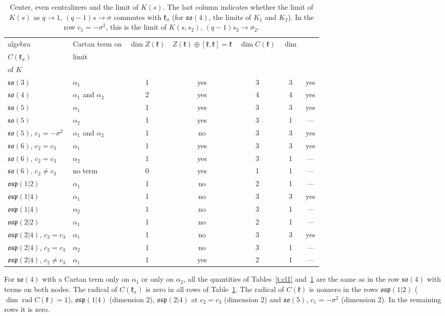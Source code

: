 \documentclass[12pt,a4paper]{article}
\makeatletter
\newcommand{\kk}{\mathfrak{k}}
\newcommand{\so}{\mathfrak{so}}
\newcommand{\osp}{\mathfrak{osp}}
\newcommand{\hd}[2][c]{\tabular[b]{@{}#1@{}}#2\endtabular}
\makeatother
\begin{document}
\begin{table}[H]
\centering\small
\setlength{\tabcolsep}{3pt}
\begin{tabular}{@{}llccccc@{}}
\toprule
algebra & Cartan term on & $\dim Z(\kk)$ & $Z(\kk)\oplus[\kk,\kk]=\kk$ & $\dim C(\kk)$ & \hd{$\dim$\\ $C(\kk_\sigma)$} & \hd{limit\\ of $K$}\\
\midrule
$\so(3)$ & $\alpha_1$ & 1 & yes & 3 & 3 & yes\\
$\so(4)$ & $\alpha_1$ and $\alpha_2$ & 2 & yes & 4 & 4 & yes\\
$\so(5)$ & $\alpha_1$ & 1 & yes & 3 & 3 & yes\\
$\so(5)$ & $\alpha_2$ & 1 & yes & 3 & 1 & ---\\
$\so(5)$, $c_1=-\sigma^2$ & $\alpha_1$ and $\alpha_2$ & 1 & no & 3 & 3 & yes\\
$\so(6)$, $c_2=c_3$ & $\alpha_1$ & 1 & yes & 3 & 3 & yes\\
$\so(6)$, $c_2=c_3$ & $\alpha_2$ & 1 & yes & 3 & 1 & ---\\
$\so(6)$, $c_2\neq c_3$ & no term & 0 & yes & 1 & 1 & ---\\
$\osp(1|2)$ & $\alpha_1$ & 1 & no & 2 & 1 & ---\\
$\osp(1|4)$ & $\alpha_1$ & 1 & no & 3 & 3 & yes\\
$\osp(1|4)$ & $\alpha_2$ & 1 & no & 3 & 1 & ---\\
$\osp(2|2)$ & $\alpha_1$ & 1 & no & 2 & 1 & ---\\
$\osp(2|4)$, $c_2=c_3$ & $\alpha_1$ & 1 & no & 3 & 3 & yes\\
$\osp(2|4)$, $c_2=c_3$ & $\alpha_2$ & 1 & no & 3 & 1 & ---\\
$\osp(2|4)$, $c_2\neq c_3$ & $\alpha_1$ & 1 & yes & 2 & 1 & ---\\
\bottomrule
\end{tabular}
\caption{Center, even centralizers and the limit of $K(s)$. The last column indicates whether the limit of $K(s)$ as $q\to1$, $(q-1)s\to\sigma$
commutes with $\kk_\sigma$ (for $\so(4)$, the limits of $K_1$ and $K_2$). In the row $c_1=-\sigma^2$, this is
the limit of $K(s,s_2)$, $(q-1)s_2\to\sigma_2$.}\label{t:cl2}
\end{table}

For $\so(4)$ with a Cartan term only on $\alpha_1$ or only on $\alpha_2$, all the quantities of Tables~\ref{t:cl1} and~\ref{t:cl2}
are the same as in the row $\so(4)$ with terms on both nodes. The radical of $C(\kk_\sigma)$ is zero in all rows of Table~\ref{t:cl2}. The radical of $C(\kk)$ is nonzero in the rows $\osp(1|2)$ ($\dim\operatorname{rad}C(\kk)=1$), $\osp(1|4)$
(dimension $2$), $\osp(2|4)$ at $c_2=c_3$ (dimension $2$) and $\so(5)$, $c_1=-\sigma^2$ (dimension $2$). In the
remaining rows it is zero.
\end{document}
